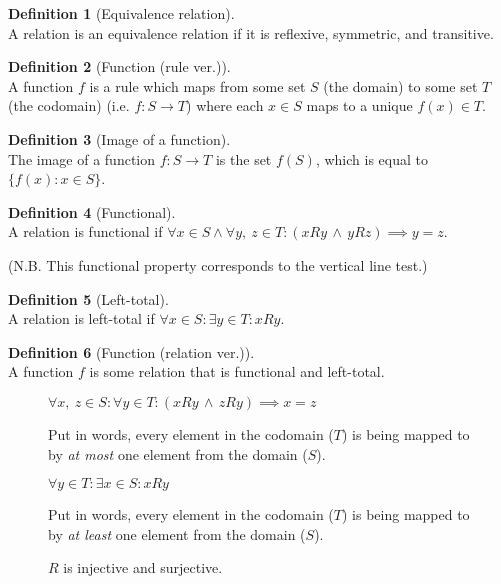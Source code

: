 \documentclass{article}
\theoremstyle{plain}
\numberwithin{theorem}{section}
\theoremstyle{definition}
\newtheorem{definition}{Definition}[section]
\numberwithin{definition}{section}
\begin{document}
\begin{adjustwidth}{-10pt}{-10pt}
\begin{multicols}{2}
\begin{definition}[Equivalence relation]\ \\
    A relation is an equivalence relation if it is
    reflexive, symmetric, and transitive.
\end{definition}
\begin{definition}[Function (rule ver.)]\ \\
    A function $f$ is a rule which maps
    from some set $S$ (the domain)
    to some set $T$ (the codomain)
    (i.e. $ f: S \to T$) where each $x \in S$ maps to a unique $f(x) \in T$.
\end{definition}
\begin{definition}[Image of a function]\ \\
    The image of a function $f: S \to T$ is the set $f(S)$,
    which is equal to $\{f(x):x \in S\}$.
\end{definition}
\begin{definition}[Functional]\ \\
    A relation is functional if
    $\forall x \in S \land \forall y,\: z \in T
        : (xRy \, \land \, yRz) \implies y=z$.

    (N.B. This functional property corresponds to the vertical line test.)
\end{definition}
\begin{definition}[Left-total]\ \\
    A relation is left-total if
    $\forall x \in S : \exists y \in T : xRy$.
\end{definition}
\begin{definition}[Function (relation ver.)]\ \\
    A function $f$ is some relation that is functional and left-total.
\end{definition}
\end{multicols}
\end{adjustwidth}
%
\begin{figure}[H]
\begin{mdframed}[style=exampledefault,frametitle={Function properties}]
\begin{description}[style=sameline]
	\item[Injective (one-to-one):]
		$\forall x,\: z \in S : \forall y \in T
		: (xRy \,\land\, zRy) \implies x = z$

		Put in words, every element in the codomain ($T$)
		is being mapped to by \textit{at most} one element from the domain ($S$).
	\item[Surjective (onto):]
		$\forall y \in T : \exists x \in S : xRy$

		Put in words, every element in the codomain ($T$)
		is being mapped to by \textit{at least} one element from the domain ($S$).
	\item[Bijective:]
		$R$ is injective and surjective.
\end{description}
\end{mdframed}
\end{figure}
\end{document}
